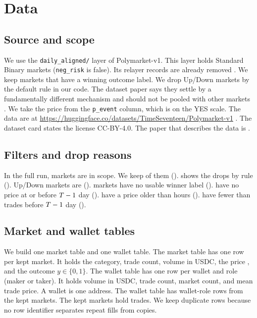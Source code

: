 \section{Data}\label{sec:data}
\subsection{Source and scope}\label{sec:data-source}
We use the \texttt{daily\_aligned/} layer of Polymarket-v1.
This layer holds Standard Binary markets (\texttt{neg\_risk} is false).
Its relayer records are already removed \citep{polymarketv1data}.
We keep markets that have a winning outcome label.
We drop Up/Down markets by the default rule in our code.
The dataset paper says they settle by a fundamentally different mechanism and should not be pooled with other markets \citep{qin2026polymarketv1}.
We take the price from the \texttt{p\_event} column, which is on the YES scale.
The data are at \url{https://huggingface.co/datasets/TimeSeventeen/Polymarket-v1} \citep{polymarketv1data}.
The dataset card states the license CC-BY-4.0.
The paper that describes the data is \citep{qin2026polymarketv1}.

\subsection{Filters and drop reasons}\label{sec:data-filters}
In the full run, \NMarketsInScope{} markets are in scope.
We keep \NMarketsKept{} of them (\PctMarketsKept).
 shows the drops by rule ().
Up/Down markets are \NUpdown{} (\PctUpdown).
\NNoOutcome{} markets have no usable winner label (\PctNoOutcome).
\NNoPrice{} have no price at or before $T-1$ day (\PctNoPrice).
\NStalePrice{} have a price older than \MaxStaleHours{} hours (\PctStalePrice).
\NBelowMinTrades{} have fewer than \MinTrades{} trades before $T-1$ day (\PctBelowMinTrades).

\subsection{Market and wallet tables}\label{sec:data-tables}
We build one market table and one wallet table.
The market table has one row per kept market.
It holds the category, trade count, volume in USDC, the price \pOne, and the outcome $y\in\{0,1\}$.
The wallet table has one row per wallet and role (maker or taker).
It holds volume in USDC, trade count, market count, and mean trade price.
A wallet is one address.
The wallet table has \NWalletRoleRows{} wallet-role rows from the kept markets.
The kept markets hold \NTradesKeptMarkets{} trades.
We keep duplicate rows because no row identifier separates repeat fills from copies.
